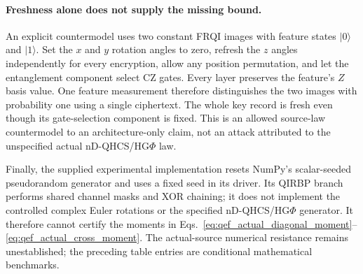 {\paragraph{Freshness alone does not supply the missing bound.}
An explicit countermodel uses two constant FRQI images with feature
states $|0\rangle$ and $|1\rangle$. Set the $x$ and $y$ rotation angles
to zero, refresh the $z$ angles independently for every encryption,
allow any position permutation, and let the entanglement component
select CZ gates. Every layer preserves the feature's $Z$ basis value.
One feature measurement therefore distinguishes the two images with
probability one using a single ciphertext. The whole key record is
fresh even though its gate-selection component is fixed. This is an
allowed source-law countermodel to an architecture-only claim, not an
attack attributed to the unspecified actual nD-QHCS/HG$\Phi$ law.

Finally, the supplied experimental implementation resets NumPy's
scalar-seeded pseudorandom generator and uses a fixed seed in its
driver. Its QIRBP branch performs shared channel masks and XOR chaining;
it does not implement the controlled complex Euler rotations or the
specified nD-QHCS/HG$\Phi$ generator. It therefore cannot certify the
moments in Eqs.~\eqref{eq:qef_actual_diagonal_moment}--
\eqref{eq:qef_actual_cross_moment}. The actual-source numerical
resistance remains unestablished; the preceding table entries are
conditional mathematical benchmarks.
\par}

